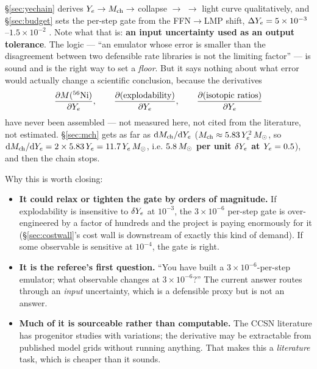 \S\ref{sec:yechain} derives $\Ye \to \Mch \to$ collapse $\to$  $\to$
light curve qualitatively, and \S\ref{sec:budget} sets the per-step gate from
the FFN$\to$LMP shift, $\dYe = 5\times10^{-3}$--$1.5\times10^{-2}$
\citep{heger2001}. Note what that is: \textbf{an input uncertainty used as an
output tolerance}. The logic --- ``an emulator whose error is smaller than the
disagreement between two defensible rate libraries is not the limiting factor''
--- is sound and is the right way to set a \emph{floor}. But it says nothing
about what error would actually change a scientific conclusion, because the
derivatives
%
\begin{equation}
\frac{\partial M(\nuc{Ni}{56})}{\partial \Ye},\qquad
\frac{\partial (\text{explodability})}{\partial \Ye},\qquad
\frac{\partial (\text{isotopic ratios})}{\partial \Ye}
\label{eq:outputderivs}
\end{equation}
%
have never been assembled --- not measured here, not cited from the literature,
not estimated. \S\ref{sec:mch} gets as far as $\dd\Mch/\dd\Ye$
($\Mch \approx 5.83\,\Ye^2\,\Msun$, so
$\dd\Mch/\dd\Ye = 2 \times 5.83\,\Ye = 11.7\,\Ye\,\Msun$, i.e.
\textbf{$5.8\,\Msun$ per unit $\delta\Ye$ at $\Ye = 0.5$}), and then the chain
stops.

Why this is worth closing:

\begin{itemize}
\item \textbf{It could relax or tighten the gate by orders of magnitude.} If
  explodability is insensitive to $\delta\Ye$ at $10^{-3}$, the $3\times10^{-6}$
  per-step gate is over-engineered by a factor of hundreds and the project is
  paying enormously for it (\S\ref{sec:costwall}'s cost wall is downstream of
  exactly this kind of demand). If some observable is sensitive at $10^{-4}$,
  the gate is right.
\item \textbf{It is the referee's first question.} ``You have built a
  $3\times10^{-6}$-per-step emulator; what observable changes at
  $3\times10^{-6}$?'' The current answer routes through an \emph{input}
  uncertainty, which is a defensible proxy but is not an answer.
\item \textbf{Much of it is sourceable rather than computable.} The CCSN
  literature has progenitor studies with \Ye{} variations; the derivative may be
  extractable from published model grids without running anything. That makes
  this a \emph{literature} task, which is cheaper than it sounds.
\end{itemize}

